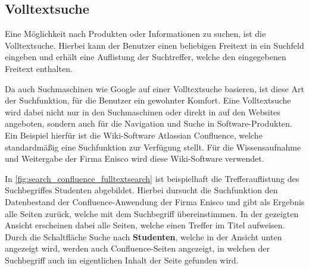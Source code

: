


\subsection{Volltextsuche\label{subsec2.1.2:Unterunterpunkt-2}}

Eine Möglichkeit nach Produkten oder Informationen zu suchen, ist die Volltextsuche. Hierbei kann der Benutzer einen beliebigen Freitext in ein Suchfeld eingeben und erhält eine Auflistung der Suchtreffer, welche den eingegebenen Freitext enthalten.

Da auch Suchmaschinen wie Google auf einer Volltextsuche basieren, ist diese Art der Suchfunktion, für die Benutzer ein gewohnter Komfort. Eine Volltextsuche wird dabei nicht nur in den Suchmaschinen oder direkt in auf den Websites angeboten, sondern auch für die Navigation und Suche in Software-Produkten. Ein Beispiel hierfür ist die Wiki-Software \glqq Atlassian Confluence\grqq{}, welche standardmäßig eine Suchfunktion zur Verfügung stellt. Für die Wissensaufnahme und Weitergabe der Firma Enisco wird diese Wiki-Software verwendet.

In \autoref{fig:search_confluence_fulltextsearch} ist beispielhaft die Trefferauflistung des Suchbegriffes \glqq Studenten\grqq{} abgebildet. Hierbei dursucht die Suchfunktion den Datenbestand der Confluence-Anwendung der Firma Enisco und gibt als Ergebnis alle Seiten zurück, welche mit dem Suchbegriff übereinstimmen. In der gezeigten Ansicht erscheinen dabei alle Seiten, welche einen Treffer im Titel aufweisen. Durch die Schaltfläche \glqq Suche nach \textbf{Studenten}\grqq{}, welche in der Ansicht unten angezeigt wird, werden auch Confluence-Seiten angezeigt, in welchen der Suchbegriff auch im eigentlichen Inhalt der Seite gefunden wird.

